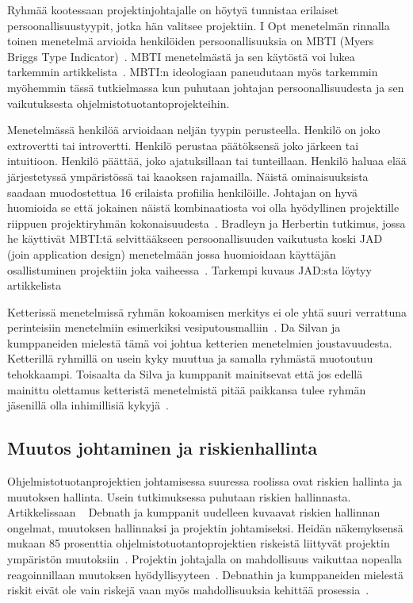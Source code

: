 \documentclass[finnish]{tktltiki2}
\theoremstyle{definition}
\theoremstyle{remark}
\begin{document}
Ryhmää kootessaan projektinjohtajalle on höytyä tunnistaa erilaiset persoonallisuustyypit, jotka hän valitsee projektiin. I Opt menetelmän rinnalla toinen menetelmä arvioida henkilöiden persoonallisuuksia on MBTI (Myers Briggs Type Indicator)~\cite{bradley1997effect}. MBTI menetelmästä ja sen käytöstä voi lukea tarkemmin artikkelista~\cite{myers1985manual}. MBTI:n ideologiaan paneudutaan myös tarkemmin myöhemmin tässä tutkielmassa kun puhutaan johtajan persoonallisuudesta ja sen vaikutuksesta ohjelmistotuotantoprojekteihin. 

Menetelmässä henkilöä arvioidaan neljän tyypin perusteella. Henkilö on joko extrovertti tai introvertti. Henkilö perustaa päätöksensä joko järkeen tai intuitioon. Henkilö päättää, joko ajatuksillaan tai tunteillaan. Henkilö haluaa elää järjestetyssä ympäristössä tai kaaoksen rajamailla. Näistä ominaisuuksista saadaan muodostettua 16 erilaista profiilia henkilöille. Johtajan on hyvä huomioida se että jokainen näistä kombinaatiosta voi olla hyödyllinen projektille riippuen projektiryhmän kokonaisuudesta~\cite{bradley1997effect}. Bradleyn ja Herbertin tutkimus, jossa he käyttivät MBTI:tä selvittääkseen persoonallisuuden vaikutusta koski JAD (join application design) menetelmään jossa huomioidaan käyttäjän osallistuminen projektiin joka vaiheessa~\cite{bradley1997effect}. Tarkempi kuvaus JAD:sta löytyy artikkelista~\cite{Davidson1999215}

Ketterissä menetelmissä ryhmän kokoamisen merkitys ei ole yhtä suuri verrattuna perinteisiin menetelmiin esimerkiksi vesiputousmalliin~\cite{daSilva2012}. Da Silvan ja kumppaneiden mielestä tämä voi johtua ketterien menetelmien joustavuudesta. Ketterillä ryhmillä on usein kyky muuttua ja samalla ryhmästä muotoutuu tehokkaampi. Toisaalta da Silva ja kumppanit mainitsevat että jos edellä mainittu olettamus ketteristä menetelmistä pitää paikkansa tulee ryhmän jäsenillä olla inhimillisiä kykyjä~\cite{daSilva2012}.


\subsection{Muutos johtaminen ja riskienhallinta}

Ohjelmistotuotanprojektien johtamisessa suuressa roolissa ovat riskien hallinta ja muutoksen hallinta. Usein tutkimuksessa puhutaan riskien hallinnasta. Artikkelissaan ~\cite{4017705} Debnath ja kumppanit uudelleen kuvaavat riskien hallinnan ongelmat, muutoksen hallinnaksi ja projektin johtamiseksi. Heidän näkemyksensä mukaan 85 prosenttia ohjelmistotuotantoprojektien riskeistä liittyvät projektin ympäristön muutoksiin~\cite{4017705}. Projektin johtajalla on mahdollisuus vaikuttaa nopealla reagoinnillaan muutoksen hyödyllisyyteen~\cite{4017705}. Debnathin ja kumppaneiden mielestä riskit eivät ole vain riskejä vaan myös mahdollisuuksia kehittää prosessia~\cite{4017705}.
\end{document}
